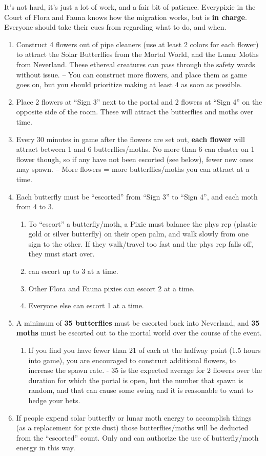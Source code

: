 \documentclass[green]{PP}
\begin{document}
\name{\gButterfly{}}

It’s not hard, it’s just a lot of work, and a fair bit of patience. Everypixie in the Court of Flora and Fauna knows how the migration works, but \cFButterfly{} is \textbf{in charge}. Everyone should take their cues from \cFButterfly{\them} regarding what to do, and when.

\begin{enumerate}
	\item Construct 4 flowers out of pipe cleaners (use at least 2 colors for each flower) to attract the Solar Butterflies from the Mortal World, and the Lunar Moths from Neverland. These ethereal creatures can pass through the safety wards without issue. -- You can construct more flowers, and place them as game goes on, but you should prioritize making at least 4 as soon as possible.
	\item Place 2 flowers at “Sign 3” next to the portal and 2 flowers at “Sign 4” on the opposite side of the room. These will attract the butterflies and moths over time.
	\item Every 30 minutes in game after the flowers are set out, \textbf{each flower} will attract between 1 and 6 butterflies/moths. No more than 6 can cluster on 1 flower though, so if any have not been escorted (see below), fewer new ones may spawn. -- More flowers = more butterflies/moths you can attract at a time.
	\item Each butterfly must be “escorted” from “Sign 3” to “Sign 4”, and each moth from 4 to 3.
	\begin{enumerate}
		\item To “escort” a butterfly/moth, a Pixie must balance the phys rep (plastic gold or silver butterfly) on their open palm, and walk slowly from one sign to the other. If they walk/travel too fast and the phys rep falls off, they must start over.
		\item \cFButterfly{} can escort up to 3 at a time.
		\item Other Flora and Fauna pixies can escort 2 at a time.
		\item Everyone else can escort 1 at a time.
	\end{enumerate}
	\item A minimum of \textbf{35 butterflies }must be escorted back into Neverland, and \textbf{35 moths }must be escorted out to the mortal world over the course of the event.
		\begin{enumerate}
		\item If you find you have fewer than 21 of each at the halfway point (1.5 hours into game), you are encouraged to construct additional flowers, to increase the spawn rate. - 35 is the expected average for 2 flowers over the duration for which the portal is open, but the number that spawn is random, and that can cause some swing and it is reasonable to want to hedge your bets.
	\end{enumerate}
	\item If people expend solar butterfly or lunar moth energy to accomplish things (as a replacement for pixie dust) those butterflies/moths will be deducted from the “escorted” count. Only \cFButterfly{} and \cFHead{} can authorize the use of butterfly/moth energy in this way. 
\end{enumerate}
\end{document}
